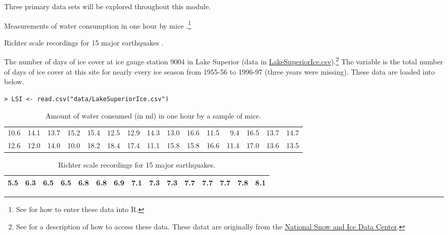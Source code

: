 \documentclass[10pt,openany]{book}\usepackage[]{graphicx}\usepackage[]{color}
\makeatletter
\newenvironment{kframe}{%
 \def\at@end@of@kframe{}%
 \ifinner\ifhmode%
  \def\at@end@of@kframe{\end{minipage}}%
  \begin{minipage}{\columnwidth}%
 \fi\fi%
 \def\FrameCommand##1{\hskip\@totalleftmargin \hskip-\fboxsep
 \colorbox{shadecolor}{##1}\hskip-\fboxsep
     \hskip-\linewidth \hskip-\@totalleftmargin \hskip\columnwidth}%
 \MakeFramed {\advance\hsize-\width
   \@totalleftmargin\z@ \linewidth\hsize
   \@setminipage}}%
 {\par\unskip\endMakeFramed%
 \at@end@of@kframe}
\newenvironment{knitrout}{}{} %
\makeatother
\begin{document}
Three primary data sets will be explored throughout this module.

\vspace{-12pt}
\begin{Itemize}
  \item Measurements of water consumption in one hour by mice .\footnote{See  for how to enter these data into R.}
  \item Richter scale recordings for 15 major earthquakes .
  \item The number of days of ice cover at ice gauge station 9004 in Lake Superior (data in \href{https://raw.githubusercontent.com/droglenc/NCData/master/LakeSuperiorIce.csv}{LakeSuperiorIce.csv}).\footnote{See  for a description of how to access these data. These datat are originally from the \href{http://www.nsidc.org/}{National Snow and Ice Data Center}.}  The  variable is the total number of days of ice cover at this site for nearly every ice season from 1955-56 to 1996-97 (three years were missing).  These data are loaded into  below.
\vspace{-6pt}
\begin{knitrout}
\color{fgcolor}\begin{kframe}
\begin{verbatim}
> LSI <- read.csv("data/LakeSuperiorIce.csv")
\end{verbatim}
\end{kframe}
\end{knitrout}
\end{Itemize}

\begin{table}[ht]
\centering
\caption{Amount of water consumed (in ml) in one hour by a sample of mice.} 
\label{tab:MouseData}
\begin{tabular}{rrrrrrrrrrrrrrr}
   \hline
10.6 & 14.1 & 13.7 & 15.2 & 15.4 & 12.5 & 12.9 & 14.3 & 13.0 & 16.6 & 11.5 & 9.4 & 16.5 & 13.7 & 14.7 \\ 
  12.6 & 12.0 & 14.0 & 10.0 & 18.2 & 18.4 & 17.4 & 11.1 & 15.8 & 15.8 & 16.6 & 11.4 & 17.0 & 13.6 & 13.5 \\ 
   \hline
\end{tabular}
\end{table}


\begin{table}[ht]
\centering
\caption{Richter scale recordings for 15 major earthquakes.} 
\label{tab:EQData}
\begin{tabular}{rrrrrrrrrrrrrrr}
   \hline
5.5 & 6.3 & 6.5 & 6.5 & 6.8 & 6.8 & 6.9 & 7.1 & 7.3 & 7.3 & 7.7 & 7.7 & 7.7 & 7.8 & 8.1 \\ 
   \hline
\end{tabular}
\end{table}
\end{document}
